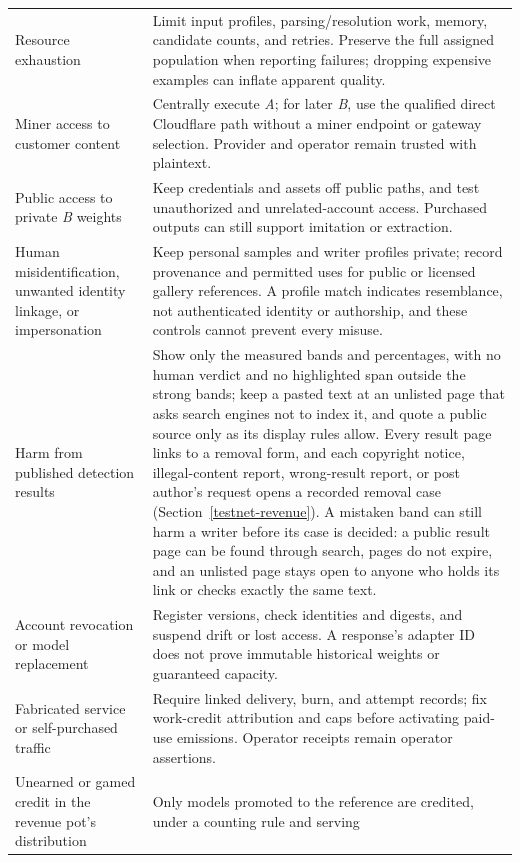 \begin{longtable}{@{}>{\raggedright\arraybackslash}p{}>{\raggedright\arraybackslash}p{}@{}}
Resource exhaustion & Limit input profiles, parsing/resolution work, memory,
candidate counts, and retries. Preserve the full assigned population when
reporting failures; dropping expensive examples can inflate apparent quality. \\
Miner access to customer content & Centrally execute \textit{A}; for later
\textit{B}, use the qualified direct Cloudflare path without a miner endpoint
or gateway selection. Provider and operator remain trusted with plaintext. \\
Public access to private \textit{B} weights & Keep credentials and assets off
public paths, and test unauthorized and unrelated-account access. Purchased
outputs can still support imitation or extraction. \\
Human misidentification, unwanted identity linkage, or impersonation & Keep
personal samples and writer profiles private; record provenance and permitted
uses for public or licensed gallery references. A profile match indicates
resemblance, not authenticated identity or authorship, and these controls
cannot prevent every misuse. \\
Harm from published detection results & Show only the measured bands and
percentages, with no human verdict and no highlighted span outside the strong
bands; keep a pasted text at an unlisted page that asks search engines not to
index it, and quote a public source only as its display rules allow. Every result
page links to a removal form, and each copyright notice, illegal-content report,
wrong-result report, or post author's request opens a recorded removal case
(Section~\ref{testnet-revenue}). A mistaken band can still harm a writer before
its case is decided: a public result page can be found through search, pages do
not expire, and an unlisted page stays open to anyone who holds its link or
checks exactly the same text. \\
Account revocation or model replacement & Register versions, check identities
and digests, and suspend drift or lost access. A response's adapter ID does not
prove immutable historical weights or guaranteed capacity. \\
Fabricated service or self-purchased traffic & Require linked delivery, burn,
and attempt records; fix work-credit attribution and caps before activating
paid-use emissions. Operator receipts remain operator assertions. \\
Unearned or gamed credit in the revenue pot's distribution & Only models
promoted to the reference are credited, under a counting rule and serving

\end{longtable}
